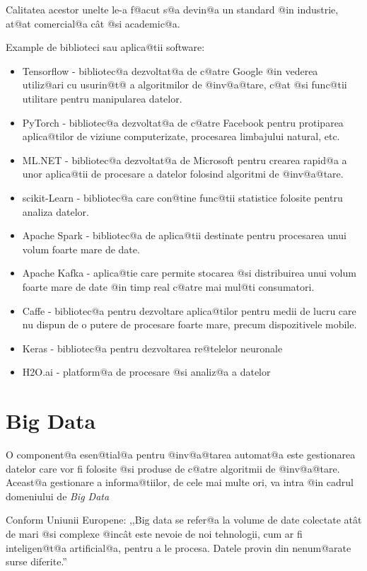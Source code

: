 Calitatea acestor unelte le-a f@acut s@a devin@a un standard @in industrie, at@at comercial@a c\^ at @si academic@a.

Example de biblioteci sau aplica@tii software:

\begin{itemize}
	\item Tensorflow - bibliotec@a dezvoltat@a de c@atre Google @in vederea utiliz@ari cu usurin@t@ a algoritmilor de @inv@a@tare, c@at @si func@tii utilitare pentru manipularea datelor.
	\item PyTorch - bibliotec@a dezvoltat@a de c@atre Facebook pentru protiparea aplica@tilor de viziune computerizate, procesarea limbajului natural, etc.
	\item ML.NET - bibliotec@a dezvoltat@a de Microsoft pentru crearea rapid@a a unor aplica@tii de procesare a datelor folosind algoritmi de @inv@a@tare.
	\item scikit-Learn - bibliotec@a care con@tine func@tii statistice folosite pentru analiza datelor.
	\item Apache Spark - bibliotec@a de aplica@tii destinate pentru procesarea unui volum foarte mare de date.
	\item Apache Kafka - aplica@tie care permite stocarea @si distribuirea unui volum foarte mare de date @in timp real c@atre mai mul@ti consumatori.
	\item Caffe - bibliotec@a pentru dezvoltare aplica@tilor pentru medii de lucru care nu dispun de o putere de procesare foarte mare, precum dispozitivele mobile.
	\item Keras - bibliotec@a pentru dezvoltarea re@telelor neuronale
	\item H2O.ai - platform@a de procesare @si analiz@a a datelor
	
\end{itemize}

\section{Big Data}


O component@a esen@tial@a pentru @inv@a@tarea automat@a este gestionarea datelor care vor fi folosite @si produse de c@atre algoritmii de @inv@a@tare. Aceast@a gestionare a informa@tiilor, de cele mai multe ori, va intra @in cadrul domeniului de {\sl Big Data }

Conform Uniunii Europene: ,,Big data se refer@a la volume de date colectate at\^ at de mari @si complexe @inc\^ at este nevoie de noi tehnologii, cum ar fi inteligen@t@a artificial@a, pentru a le procesa. Datele provin din nenum@arate surse diferite.''\cite{eu-big-data-definition}

